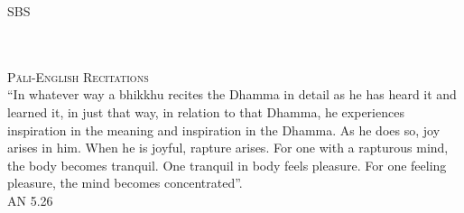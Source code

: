 
\cleartorecto
\thispagestyle{empty}
\vspace*{1em}

{\centering


  {\Huge\fontsize{45}{11}\sbsFont SBS}\\[1.0\baselineskip]%

  {\fontsize{18}{14}\chapterTitleFont\textsc{{\thesubtitle\linebreak}}}\\[0.2\baselineskip]

  \\[1.4\baselineskip]

  {\fontsize{10.5}{12}\scshape Pāli-English Recitations}\\[2.5\baselineskip]

  {\quote ``In whatever way a bhikkhu recites the Dhamma in detail as he has heard it and learned it, in just that way, in relation to that Dhamma, he experiences inspiration in the meaning and inspiration in the Dhamma. As he does so, joy arises in him. When he is joyful, rapture arises. For one with a rapturous mind, the body becomes tranquil. One tranquil in body feels pleasure. For one feeling pleasure, the mind becomes concentrated''.\\}\medskip\tiny AN 5.26\\[1.4\baselineskip]
}


